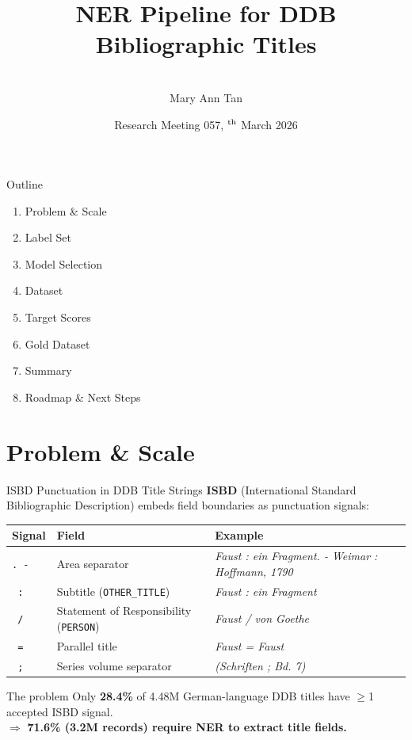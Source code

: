\documentclass[xcolor,aspectratio=169,compress]{beamer}
\title[RM 057 --- GeMeA NER]{NER Pipeline for DDB Bibliographic Titles}
\author[M.A.\ Tan]{
  \\[.8cm]
  Mary Ann Tan}
\institute[FIZ-KDAI]{FIZ Karlsruhe -- Leibniz Institute for Information Infrastructure, KDAI}
\date[RM 057, 30.03.2026]{Research Meeting 057, {\sansmath 30$^{\rm th}$} March 2026}
\begin{document}
\frame[plain]{\titlepage}

\begin{frame}{Outline}
  \begin{enumerate}
    \item Problem \& Scale
    \item Label Set
    \item Model Selection
    \item Dataset
    \item Target Scores
    \item Gold Dataset
    \item Summary
    \item Roadmap \& Next Steps
  \end{enumerate}
\end{frame}

\section{Problem \& Scale}

\begin{frame}{ISBD Punctuation in DDB Title Strings}
  \small
  \textbf{ISBD} (International Standard Bibliographic Description) embeds field boundaries as punctuation signals:
  \smallskip
  \begin{center}
  \begin{tabular}{lll}
    \toprule
    Signal & Field & Example \\
    \midrule
    \texttt{. -} & Area separator & \textit{Faust : ein Fragment. - Weimar : Hoffmann, 1790} \\
    \texttt{ :}  & Subtitle (\texttt{OTHER\_TITLE}) & \textit{Faust : ein Fragment} \\
    \texttt{ /}  & Statement of Responsibility (\texttt{PERSON}) & \textit{Faust / von Goethe} \\
    \texttt{ =}  & Parallel title & \textit{Faust = Faust} \\
    \texttt{ ;}  & Series volume separator & \textit{(Schriften ; Bd. 7)} \\
    \bottomrule
  \end{tabular}
  \end{center}
  \smallskip
  \begin{block}{The problem}
    Only \textbf{28.4\%} of 4.48M German-language DDB titles have $\geq$1 accepted ISBD signal.\\
    $\Rightarrow$ \textbf{71.6\% (3.2M records) require NER to extract title fields.}
  \end{block}
\end{frame}
\end{document}
